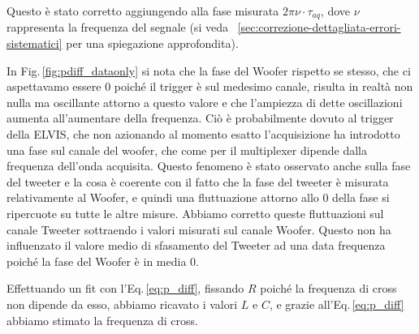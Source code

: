 \documentclass[../Relazione_circuiti]{subfiles}
\begin{document}
  Questo è stato corretto aggiungendo alla fase misurata $ 2 \pi \nu \cdot \tau_{aq}$, dove $\nu$
  rappresenta la frequenza del segnale (si veda ~\ref{sec:correzione-dettagliata-errori-sistematici} per una spiegazione approfondita).

  In Fig.\,\ref{fig:pdiff_dataonly} si nota che la fase del Woofer rispetto se stesso, che ci aspettavamo essere 0
  poiché il trigger è sul medesimo canale, risulta in realtà non nulla ma oscillante attorno a questo valore e che
  l'ampiezza di dette oscillazioni aumenta all'aumentare della frequenza.
  Ciò è probabilmente dovuto al trigger della ELVIS, che non azionando al momento esatto l'acquisizione ha introdotto
  una fase sul canale del woofer, che come per il multiplexer dipende dalla frequenza dell'onda acquisita.
  Questo fenomeno è stato osservato anche sulla fase del tweeter e la cosa è coerente con il fatto che la fase del
  tweeter è misurata relativamente al Woofer, e quindi una fluttuazione attorno allo 0 della fase si ripercuote su tutte
  le altre misure.
  Abbiamo corretto queste fluttuazioni sul canale Tweeter sottraendo i valori misurati sul canale Woofer.
  Questo non ha influenzato il valore medio di sfasamento del Tweeter ad una data frequenza poiché la fase del Woofer è
  in media 0.

  Effettuando un fit con l'Eq.\,\eqref{eq:p_diff}, fissando $R$
  poiché la frequenza di cross non dipende da esso, abbiamo
  ricavato i valori $L$ e $C$, e grazie all'Eq.\,\eqref{eq:p_diff} abbiamo stimato la frequenza di cross.

 
\end{document}
